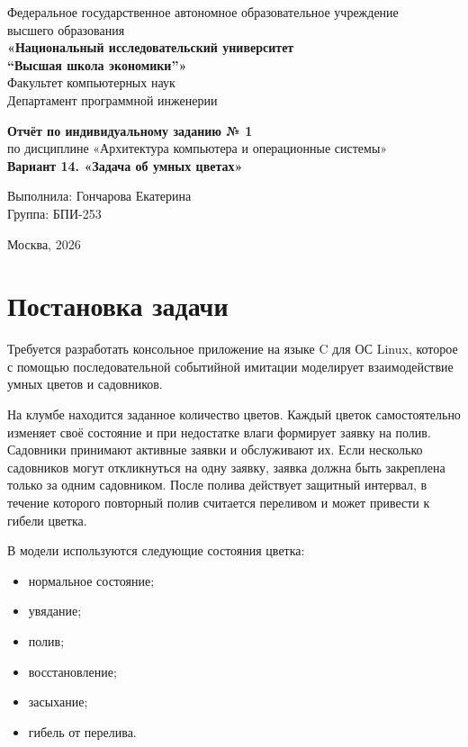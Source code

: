 \documentclass[12pt,a4paper]{article}
\begin{document}
\begin{titlepage}
    \begin{center}
        Федеральное государственное автономное образовательное учреждение\\
        высшего образования\\[2mm]
        \textbf{«Национальный исследовательский университет\\
        ``Высшая школа экономики''»}\\[3mm]
        Факультет компьютерных наук\\
        Департамент программной инженерии

        \vfill

        {\Large \textbf{Отчёт по индивидуальному заданию № 1}}\\[4mm]
        {\large по дисциплине «Архитектура компьютера и операционные системы»}\\[8mm]
        {\Large \textbf{Вариант 14. «Задача об умных цветах»}}

        \vfill

        \begin{flushright}
            Выполнила: Гончарова Екатерина\\[3mm]
            Группа: БПИ-253
        \end{flushright}

        \vfill
        Москва, 2026
    \end{center}
\end{titlepage}

\tableofcontents
\newpage

\section{Постановка задачи}

Требуется разработать консольное приложение на языке C для ОС Linux,
которое с помощью последовательной событийной имитации моделирует
взаимодействие умных цветов и садовников.

На клумбе находится заданное количество цветов. Каждый цветок самостоятельно
изменяет своё состояние и при недостатке влаги формирует заявку на полив.
Садовники принимают активные заявки и обслуживают их. Если несколько садовников
могут откликнуться на одну заявку, заявка должна быть закреплена только за одним
садовником. После полива действует защитный интервал, в течение которого
повторный полив считается переливом и может привести к гибели цветка.

В модели используются следующие состояния цветка:
\begin{itemize}[noitemsep]
    \item нормальное состояние;
    \item увядание;
    \item полив;
    \item восстановление;
    \item засыхание;
    \item гибель от перелива.
\end{itemize}
\end{document}
